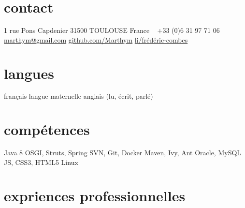\documentclass{friggeri-cv} 	%
\begin{document}


\begin{aside} %
\section{contact}
1 rue Pons Capdenier
31500 TOULOUSE
France
~
+33 (0)6 31 97 71 06
\href{mailto:marthym@gmail.com}{marthym@gmail.com}
\href{https://github.com/Marthym}{github.com/Marthym}
\href{https://fr.linkedin.com/pub/frédéric-combes/91/820/108/}{li/frédéric-combes}
\section{langues}
français langue maternelle
anglais (lu, écrit, parlé)
\section{compétences}
Java 8
OSGI, Struts, Spring
SVN, Git, Docker
Maven, Ivy, Ant
Oracle, MySQL
JS, CSS3, HTML5
Linux
\end{aside}

\section{expriences professionnelles}
\end{document}
